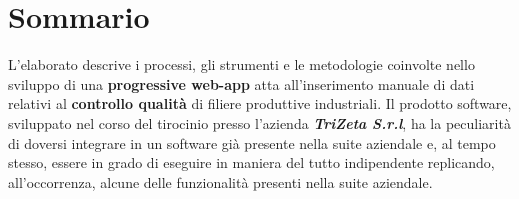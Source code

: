 \cleardoublepage
{}
{}
\begingroup
\let\clearpage\relax
\let\cleardoublepage\relax
\let\cleardoublepage\relax

\chapter*{Sommario}
L'elaborato descrive i processi, gli strumenti e le metodologie coinvolte nello sviluppo di una \textbf{progressive web-app} atta all'inserimento manuale di dati relativi al \textbf{controllo qualità} di filiere produttive industriali. 
\newline
Il prodotto software, sviluppato nel corso del tirocinio presso l'azienda \textit{\textbf{TriZeta S.r.l}}, ha la peculiarità di doversi integrare in un software già presente nella suite aziendale e, al tempo stesso, essere in grado di eseguire in maniera del tutto indipendente replicando, all'occorrenza, alcune delle funzionalità presenti nella suite aziendale.



\endgroup

\vfill
